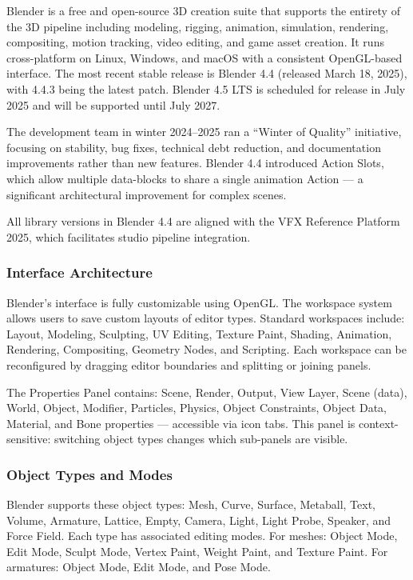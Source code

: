 \documentclass[11pt,letterpaper]{article}
\begin{document}
Blender is a free and open-source 3D creation suite that supports the entirety of the 3D pipeline including modeling, rigging, animation, simulation, rendering, compositing, motion tracking, video editing, and game asset creation. It runs cross-platform on Linux, Windows, and macOS with a consistent OpenGL-based interface. The most recent stable release is Blender 4.4 (released March 18, 2025), with 4.4.3 being the latest patch. Blender 4.5 LTS is scheduled for release in July 2025 and will be supported until July 2027.

The development team in winter 2024--2025 ran a ``Winter of Quality'' initiative, focusing on stability, bug fixes, technical debt reduction, and documentation improvements rather than new features. Blender 4.4 introduced Action Slots, which allow multiple data-blocks to share a single animation Action --- a significant architectural improvement for complex scenes.

All library versions in Blender 4.4 are aligned with the VFX Reference Platform 2025, which facilitates studio pipeline integration.

\subsubsection{Interface Architecture}

Blender's interface is fully customizable using OpenGL. The workspace system allows users to save custom layouts of editor types. Standard workspaces include: Layout, Modeling, Sculpting, UV Editing, Texture Paint, Shading, Animation, Rendering, Compositing, Geometry Nodes, and Scripting. Each workspace can be reconfigured by dragging editor boundaries and splitting or joining panels.

The Properties Panel contains: Scene, Render, Output, View Layer, Scene (data), World, Object, Modifier, Particles, Physics, Object Constraints, Object Data, Material, and Bone properties --- accessible via icon tabs. This panel is context-sensitive: switching object types changes which sub-panels are visible.

\subsubsection{Object Types and Modes}

Blender supports these object types: Mesh, Curve, Surface, Metaball, Text, Volume, Armature, Lattice, Empty, Camera, Light, Light Probe, Speaker, and Force Field. Each type has associated editing modes. For meshes: Object Mode, Edit Mode, Sculpt Mode, Vertex Paint, Weight Paint, and Texture Paint. For armatures: Object Mode, Edit Mode, and Pose Mode.
\end{document}
